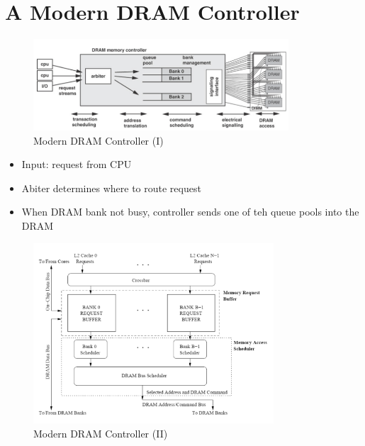 \documentclass[]{article}
\providecommand{\tightlist}{%
  \setlength{\itemsep}{0pt}\setlength{\parskip}{0pt}}
\begin{document}
\newpage

\hypertarget{a-modern-dram-controller}{%
\section{A Modern DRAM Controller}\label{a-modern-dram-controller}}

\begin{figure}
\centering
\includegraphics[width=0.85\textwidth,height=\textheight]{./tex2pdf.-ee748c56ff17e1e1/8e99ce871822a47fe3b076cbbf3a56a022e165ce.png}
\caption{Modern DRAM Controller (I)}
\end{figure}

\begin{itemize}
\tightlist
\item
  Input: request from CPU
\item
  Abiter determines where to route request
\item
  When DRAM bank not busy, controller sends one of teh queue pools into
  the DRAM
\end{itemize}

\begin{figure}
\centering
\includegraphics[width=0.8\textwidth,height=\textheight]{./tex2pdf.-ee748c56ff17e1e1/2faebcbb6c088bff74c716b76f0e7052de951bce.png}
\caption{Modern DRAM Controller (II)}
\end{figure}
\end{document}
